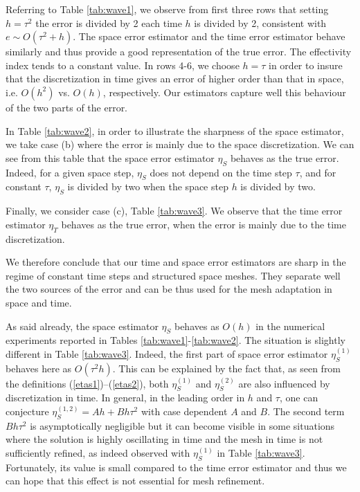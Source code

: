 \documentclass{imanum}
\begin{document}
Referring to Table \ref{tab:wave1}, we observe from first three rows that setting $h = \tau^2$ the error is divided by 2 each time $h$ is divided by 2, consistent with $e\sim O(\tau^2+h)$. The space error estimator and the time error estimator behave similarly and thus provide a good representation of the true error. The effectivity index tends to a constant value. In rows 4-6, we choose $h = \tau$ in order to insure that the discretization in time gives an error of higher order than that in space, i.e. $O(h^2)$ vs. $O(h)$, respectively. Our estimators capture well this behaviour of the two parts of the error.

In Table \ref{tab:wave2}, in order to illustrate the sharpness of the space estimator,  we take case (b) where the error is mainly due to the space discretization. We can see from this table that the space error estimator $\eta_{S}$ behaves as the true error. Indeed, for a given space step, $\eta_{S}$ does not depend on the time step $\tau$, and for constant $\tau$, $\eta_{S}$ is divided by two when the space step $h$ is divided by two.

Finally, we consider case (c), Table \ref{tab:wave3}. We observe that the time error estimator $\eta_{T}$ behaves as the true error, when the error is mainly due to the time discretization.

We therefore conclude that our time and space error estimators are sharp in the regime of constant time steps and structured space meshes. They separate well the two sources of the error and can be thus used for the mesh adaptation in space and time.
\begin{remark}
As said already, the space estimator $\eta_S$ behaves as $O(h)$ in  the numerical experiments reported in Tables \ref{tab:wave1}-\ref{tab:wave2}. The situation is slightly different in Table \ref{tab:wave3}. Indeed, the first part of space error estimator $\eta^{(1)}_S$ behaves here as $O(\tau^2h)$. This can be explained by the fact that, as seen from the definitions (\ref{etas1})--(\ref{etas2}), both $\eta_S^{(1)}$ and $\eta_S^{(2)}$ are also influenced by discretization in time. In general, in the leading order in $h$ and $\tau$, one can conjecture $\eta_S^{(1,2)}=Ah+Bh\tau^2$ with case dependent $A$ and $B$. The second term $Bh\tau^2$ is asymptotically negligible but it can become visible in some situations where the solution is highly oscillating in time and the mesh in time is not sufficiently refined, as indeed observed with $\eta^{(1)}_S$ in Table \ref{tab:wave3}. Fortunately, its value is small compared to the time error estimator and thus we can hope that this effect is not essential for mesh refinement.
\end{remark}
\end{document}
